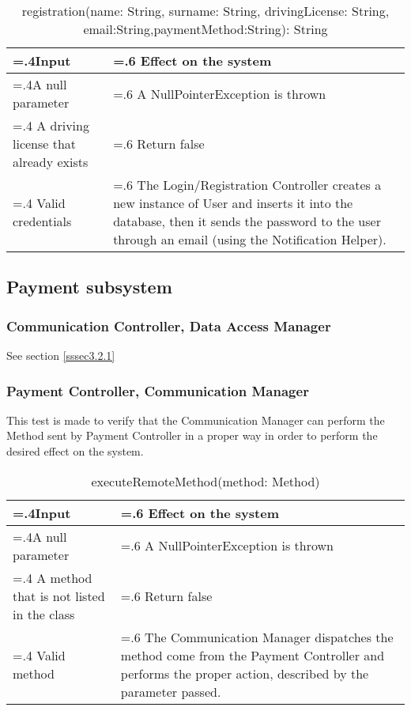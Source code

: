 \documentclass[10pt, a4paper,titlepage]{article}
\begin{document}
\begin{table}[h]
\caption{registration(name: String, surname: String, drivingLicense: String, email:String,paymentMethod:String): String}
\begin{tabularx}{\textwidth}{|>{\hsize=.4\hsize}X|>{\hsize=.6\hsize}X|}
\hline
Input & Effect on the system\\
\hline
A null parameter & A NullPointerException is thrown\\
\hline
A driving license that already exists & Return false\\
\hline
Valid credentials & The Login/Registration Controller creates a new instance of User and inserts it into the database, then it sends the password to the user through an email (using the Notification Helper).\\
\hline
\end{tabularx}
\end{table}
\pagebreak
\linebreak
\subsection{Payment subsystem}
\subsubsection{Communication Controller, Data Access Manager}
See section \ref{sssec3.2.1}
\subsubsection{Payment Controller, Communication Manager}
This test is made to verify that the Communication Manager can perform the Method sent by Payment Controller in a proper way in order to perform the desired effect on the system.
\begin{table}[h]
\caption{executeRemoteMethod(method: Method)}
\begin{tabularx}{\textwidth}{|>{\hsize=.4\hsize}X|>{\hsize=.6\hsize}X|}
\hline
Input & Effect on the system\\
\hline
A null parameter & A NullPointerException is thrown\\
\hline
A method that is not listed in the class & Return false\\
\hline
Valid method & The Communication Manager dispatches the method come from the Payment Controller and performs the proper action, described by the parameter passed.\\
\hline
\end{tabularx}
\end{table}
\linebreak
\clearpage
\end{document}

